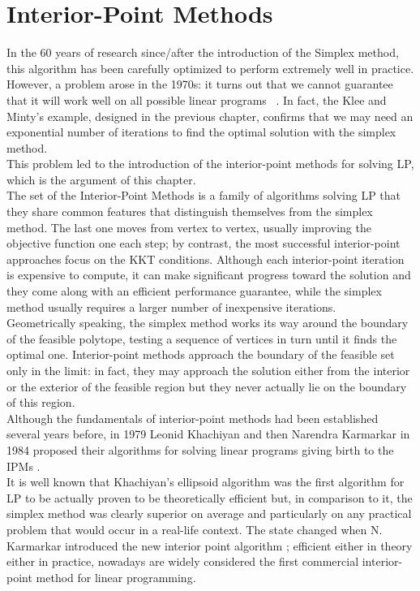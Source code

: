 \documentclass[a4paper,10 pt,titlepage,twoside]{book}
\theoremstyle{plain}
\theoremstyle{definition}
\theoremstyle{remark}
\begin{document}
\chapter{Interior-Point Methods}
In the 60 years of research since/after the introduction of the Simplex method, this algorithm has been carefully optimized to perform extremely well in practice. However, a problem arose in the 1970s: it turns out that we cannot guarantee that it will work well on all possible linear programs ~\cite{MINTY}.
In fact, the Klee and Minty's example, designed in the previous chapter, confirms that we may need an exponential number of iterations to find the optimal solution with the simplex method. \\
This problem led to the introduction of the interior-point methods for solving LP, which is the argument of this chapter.\\
The set of the Interior-Point Methods is a family of algorithms solving LP that they share common features that distinguish themselves from the simplex method. The last one moves from vertex to vertex, usually improving the objective function
one each step; by contrast, the most successful interior-point approaches focus on the KKT conditions. Although each interior-point iteration is expensive to compute, it can make significant progress toward the solution and they come along with an efficient performance guarantee, while the simplex method usually requires a larger number of inexpensive iterations.\\
Geometrically speaking, the simplex method works its way around
the boundary of the feasible polytope, testing a sequence of vertices in turn until it finds the
optimal one. Interior-point methods approach the boundary of the feasible set only in the
limit: in fact, they may approach the solution either from the interior or the exterior of the feasible
region but they never actually lie on the boundary of this region.\\
Although the fundamentals of interior-point methods had been established several years
before, in 1979 Leonid Khachiyan and then Narendra Karmarkar in 1984 proposed their algorithms for solving linear programs giving birth to the IPMs \cite{WWW}. \\It is well known that Khachiyan’s ellipsoid algorithm was the first algorithm for LP to be actually proven to
be theoretically efficient but, in comparison to it, the simplex method was clearly superior on average and particularly on any practical
problem that would occur in a real-life context. The state changed when N. Karmarkar introduced the new interior point algorithm \cite{Kar}; efficient either in theory either in practice, nowadays are widely considered the first commercial interior-point
method for linear programming.\\
\end{document}
